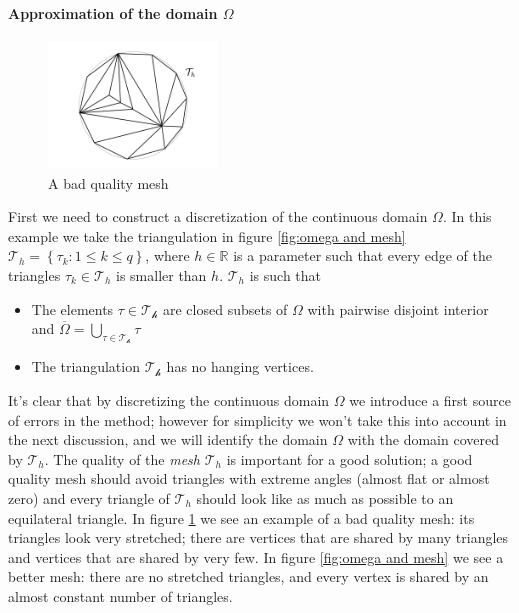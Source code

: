 \paragraph{Approximation of the domain $\Omega$}
 \begin{figure}\label{fig:bad mesh}
 	\begin{center}
 		\includegraphics[width=0.4\textwidth]{figs/Chapter3/badmesh.png}
 	\end{center}
 	\caption{A bad quality mesh}
 \end{figure}
First we need to construct a discretization of the continuous domain $\Omega$. In this example we take the triangulation in figure \ref{fig:omega and mesh} $\mathcal T_h = \left\{\tau_{k} : 1 \leq k \leq q\right\}$, where $h\in\mathbb R$ is a parameter such that every edge of the triangles $\tau_k\in\mathcal T_h$ is smaller than $h$. $\mathcal T_h$ is such that 
\begin{itemize}
	\item The elements \(\tau \in \mathcal{T_h}\) are closed subsets of \(\Omega\) with pairwise disjoint interior and \(\overline{\Omega}=\bigcup_{\tau \in \mathcal{T_h}} \tau\)
	\item The triangulation \(\mathcal{T_h}\) has no hanging vertices.
\end{itemize}

It's clear that by discretizing the continuous domain $\Omega$ we introduce a first source of errors in the method; however for simplicity we won't take this into account in the next discussion, and we will identify the domain $\Omega$ with the domain covered by $\mathcal T_h$. The quality of the \textit{mesh} $\mathcal T_h$ is important for a good solution; a good quality mesh should avoid triangles with extreme angles (almost flat or almost zero) and every triangle of $\mathcal T_h$ should look like as much as possible to an equilateral triangle. In figure \ref{fig:bad mesh} we see an example of a bad quality mesh: its triangles look very stretched; there are vertices that are shared by many triangles and vertices that are shared by very few. In figure \ref{fig:omega and mesh} we see a better mesh: there are no stretched triangles, and every vertex is shared by an almost constant number of triangles.


